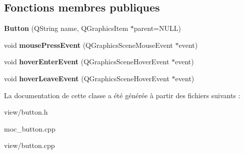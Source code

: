 \subsection*{Fonctions membres publiques}
\begin{DoxyCompactItemize}
\item 
\hypertarget{classButton_a69976e5c00874a3807b642f249c1c776}{{\bfseries Button} (Q\+String name, Q\+Graphics\+Item $\ast$parent=N\+U\+L\+L)}\label{classButton_a69976e5c00874a3807b642f249c1c776}

\item 
\hypertarget{classButton_a17d8eb0c904605b223bbc00c75655315}{void {\bfseries mouse\+Press\+Event} (Q\+Graphics\+Scene\+Mouse\+Event $\ast$event)}\label{classButton_a17d8eb0c904605b223bbc00c75655315}

\item 
\hypertarget{classButton_a633a9684818bc5d300a622a00064f09c}{void {\bfseries hover\+Enter\+Event} (Q\+Graphics\+Scene\+Hover\+Event $\ast$event)}\label{classButton_a633a9684818bc5d300a622a00064f09c}

\item 
\hypertarget{classButton_a1689a97690d9469ce8350d24db0d7485}{void {\bfseries hover\+Leave\+Event} (Q\+Graphics\+Scene\+Hover\+Event $\ast$event)}\label{classButton_a1689a97690d9469ce8350d24db0d7485}

\end{DoxyCompactItemize}


La documentation de cette classe a été générée à partir des fichiers suivants \+:\begin{DoxyCompactItemize}
\item 
view/button.\+h\item 
moc\+\_\+button.\+cpp\item 
view/button.\+cpp\end{DoxyCompactItemize}
